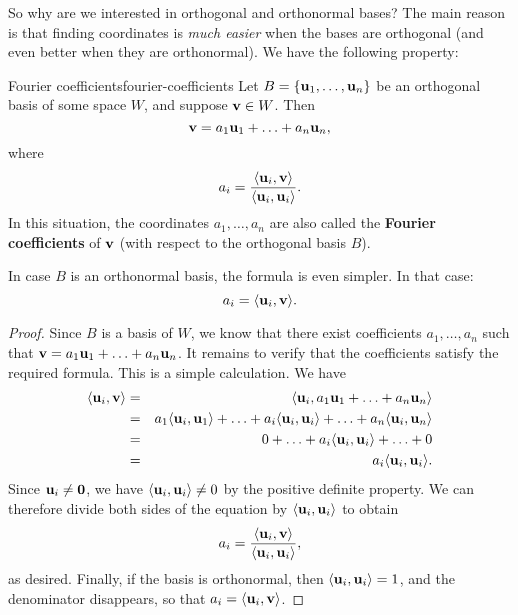 So why are we interested in orthogonal and orthonormal bases? The main
reason is that finding coordinates is {\em much easier} when the bases
are orthogonal (and even better when they are orthonormal). We have
the following property:

\begin{proposition}{Fourier coefficients}{fourier-coefficients}
  Let $B=\set{\vect{u}_1,\ldots,\vect{u}_n}$ be an orthogonal basis of
  some space $W$, and suppose $\vect{v}\in W$. Then
  \begin{equation*}
    \vect{v} = a_1\vect{u}_1 + \ldots + a_n\vect{u}_n,
  \end{equation*}
  where
  \begin{equation*}
    a_i = \frac{\iprod{\vect{u}_i,\vect{v}}}{\iprod{\vect{u}_i,\vect{u}_i}}.
  \end{equation*}
  In this situation, the coordinates $a_1,\ldots,a_n$ are also called
  the \textbf{Fourier coefficients}%
   of $\vect{v}$ (with respect to the
  orthogonal basis $B$).
  \smallskip\smallskip

  In case $B$ is an orthonormal basis, the formula is even simpler. In
  that case:
    \begin{equation*}
    a_i = \iprod{\vect{u}_i,\vect{v}}.
  \end{equation*}
\end{proposition}

\begin{proof}
  Since $B$ is a basis of $W$, we know that there exist coefficients
  $a_1,\ldots,a_n$ such that
  $\vect{v} = a_1\vect{u}_1 + \ldots + a_n\vect{u}_n$. It remains to
  verify that the coefficients satisfy the required formula. This is a
  simple calculation. We have
  \begin{eqnarray*}
    \iprod{\vect{u}_i,\vect{v}}
    &=& \iprod{\vect{u}_i, a_1\vect{u}_1 + \ldots + a_n\vect{u}_n} \\
    &=& a_1\iprod{\vect{u}_i,\vect{u}_1}
        + \ldots
        + a_i\iprod{\vect{u}_i,\vect{u}_i}
        + \ldots
        + a_n\iprod{\vect{u}_i,\vect{u}_n} \\
    &=& 0
        + \ldots
        + a_i\iprod{\vect{u}_i,\vect{u}_i}
        + \ldots
        + 0 \\
    &=& a_i \iprod{\vect{u}_i,\vect{u}_i}.
  \end{eqnarray*}
  Since $\vect{u}_i\neq \vect{0}$, we have
  $\iprod{\vect{u}_i,\vect{u}_i}\neq 0$ by the positive definite
  property. We can therefore divide both sides of the equation by
  $\iprod{\vect{u}_i,\vect{u}_i}$ to obtain
  \begin{equation*}
    a_i = \frac{\iprod{\vect{u}_i,\vect{v}}}{\iprod{\vect{u}_i,\vect{u}_i}},
  \end{equation*}
  as desired. Finally, if the basis is orthonormal, then
  $\iprod{\vect{u}_i,\vect{u}_i}=1$, and the denominator disappears,
  so that $a_i = \iprod{\vect{u}_i,\vect{v}}$.
\end{proof}

